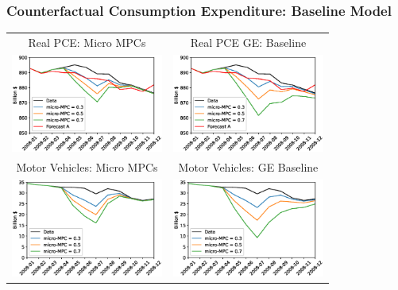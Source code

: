 \documentclass[english,xcolor=svgnames]{beamer}
\begin{document}
\begin{frame}[label=baselineforecasts]
\frametitle{Counterfactual Consumption Expenditure: Baseline Model}

\begin{center}
\footnotesize
\centering
    \begin{tabular}{cc}
    Real PCE: Micro MPCs & Real PCE GE: Baseline \\
    \includegraphics[width=5cm]{figures/Real_PCEfc_micro_baseline.eps} &   \includegraphics[width=5cm]{figures/Real_PCEfc_GE_baseline.eps} \\
    Motor Vehicles: Micro MPCs & Motor Vehicles: GE Baseline \\
    \includegraphics[width=5cm]{figures/Real_Motorvehicles_micro_baseline.eps} &  \includegraphics[width=5cm]{figures/Real_Motorvehicles_GE_baseline.eps} \\
    \end{tabular} \\
 \end{center} 
 \vspace{-0.5cm}
\end{frame}
\end{document}
